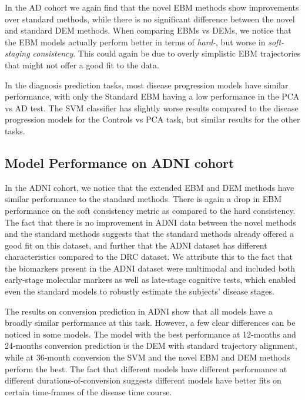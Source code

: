 In the AD cohort we again find that the novel EBM methods show improvements over standard methods, while there is no significant difference between the novel and standard DEM methods. When comparing EBMs vs DEMs, we notice that the EBM models actually perform better in terms of \emph{hard-}, but worse in \emph{soft-staging consistency}. This could again be due to overly simplistic EBM trajectories that might not offer a good fit to the data.

In the diagnosis prediction tasks, most disease progression models have similar performance, with only the Standard EBM having a low performance in the PCA vs AD test. The SVM classifier has slightly worse results compared to the disease progression models for the Controls vs PCA task, but similar results for the other tasks.  

\subsection{Model Performance on ADNI cohort}
\label{sec:perfDisAdni}

In the ADNI cohort, we notice that the extended EBM and DEM methods have similar performance to the standard methods. There is again a drop in EBM performance on the soft consistency metric as compared to the hard consistency. The fact that there is no improvement in ADNI data between the novel methods and the standard methods suggests that the standard methods already offered a good fit on this dataset, and further that the ADNI dataset has different characteristics compared to the DRC dataset. We attribute this to the fact that the biomarkers present in the ADNI dataset were multimodal and included both early-stage molecular markers as well as late-stage cognitive tests, which enabled even the standard models to robustly estimate the subjects' disease stages. 


The results on conversion prediction in ADNI show that all models have a broadly similar performance at this task. However, a few clear differences can be noticed in some models. The model with the best performance at 12-months and 24-months conversion prediction is the DEM with standard trajectory alignment, while at 36-month conversion the SVM and the novel EBM and DEM methods perform the best. The fact that different models have different performance at different durations-of-conversion suggests different models have better fits on certain time-frames of the disease time course.


